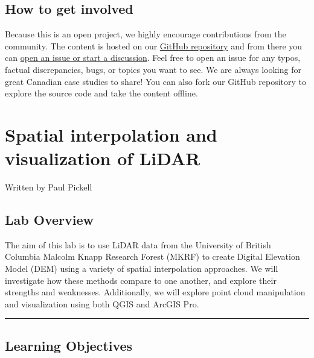 \documentclass[
]{book}
\begin{document}
\hypertarget{how-to-get-involved}{%
\section*{How to get involved}\label{how-to-get-involved}}

Because this is an open project, we highly encourage contributions from the community. The content is hosted on our \href{https://github.com/ubc-geomatics-community-of-practice/UFOR511-Geomatics-Principles-and-Applications}{GitHub repository} and from there you can \href{https://github.com/ubc-geomatics-community-of-practice/UFOR511-Geomatics-Principles-and-Applications/issues/new}{open an issue or start a discussion}. Feel free to open an issue for any typos, factual discrepancies, bugs, or topics you want to see. We are always looking for great Canadian case studies to share! You can also fork our GitHub repository to explore the source code and take the content offline.

\hypertarget{terrain-spatial-interpolation}{%
\chapter{Spatial interpolation and visualization of LiDAR}\label{terrain-spatial-interpolation}}

Written by
Paul Pickell

\hypertarget{lab-overview}{%
\section*{Lab Overview}\label{lab-overview}}

The aim of this lab is to use LiDAR data from the University of British Columbia Malcolm Knapp Research Forest (MKRF) to create Digital Elevation Model (DEM) using a variety of spatial interpolation approaches. We will investigate how these methods compare to one another, and explore their strengths and weaknesses. Additionally, we will explore point cloud manipulation and visualization using both QGIS and ArcGIS Pro.

\begin{center}\rule{0.5\linewidth}{0.5pt}\end{center}

\hypertarget{learning-objectives}{%
\section*{Learning Objectives}\label{learning-objectives}}
\end{document}
